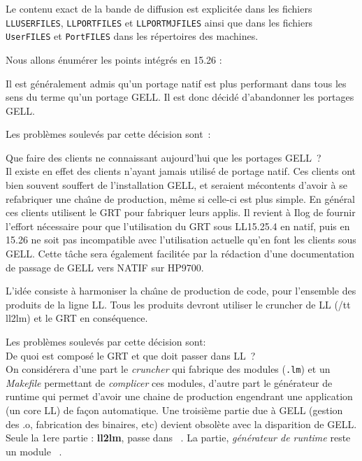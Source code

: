 Le contenu exact de la bande de diffusion est explicit\'{e}e dans les
fichiers {\tt LLUSERFILES}, {\tt LLPORTFILES} et {\tt LLPORTMJFILES}
ainsi que dans les fichiers {\tt UserFILES} et {\tt PortFILES} dans
les r\'{e}pertoires des machines.

Nous allons \'{e}num\'{e}rer les points int\'{e}gr\'{e}s en 15.26 :

Il est g\'{e}n\'{e}ralement admis qu'un portage natif est plus performant
dans tous les sens du terme qu'un portage GELL. Il est donc d\'{e}cid\'{e}
d'abandonner les portages GELL.

Les probl\`{e}mes soulev\'{e}s par cette d\'{e}cision sont\ : 

Que faire des clients ne connaissant aujourd'hui que les portages
GELL\ ? \\
Il existe en effet des clients n'ayant jamais utilis\'{e} de portage
natif. Ces clients ont bien souvent souffert de l'installation GELL,
et seraient m\'{e}contents d'avoir \`{a} se refabriquer une cha\^{\i}ne de
production, m\^{e}me si celle-ci est plus simple. En g\'{e}n\'{e}ral ces clients
utilisent le GRT pour fabriquer leurs applis. Il revient \`{a} Ilog de
fournir l'effort n\'{e}cessaire pour que l'utilisation du GRT sous
LL15.25.4 en natif, puis en 15.26 ne soit pas incompatible avec l'utilisation
actuelle qu'en font les clients sous GELL. Cette t\^{a}che sera
\'{e}galement facilit\'{e}e par la r\'{e}daction d'une documentation de passage
de GELL vers NATIF sur HP9700.

L'id\'{e}e consiste \`{a} harmoniser la cha\^{\i}ne de production de code, pour
l'ensemble des produits de la ligne LL. Tous les produits devront
utiliser le cruncher de LL ({/tt ll2lm}) et le GRT en cons\'{e}quence.

Les probl\`{e}mes soulev\'{e}s par cette d\'{e}cision sont: \\

De quoi est compos\'{e} le GRT et que doit passer dans LL\ ? \\
On consid\'{e}rera d'une part le {\it cruncher} qui fabrique des modules
({\tt .lm}) et un {\it Makefile} permettant de {\it complicer} ces
modules, d'autre part le g\'{e}n\'{e}rateur de runtime qui permet d'avoir
une chaine de production engendrant une application (un core LL) de
fa\c{c}on automatique. Une troisi\`{e}me partie due \`{a} GELL (gestion des .o,
fabrication des binaires, etc) devient obsol\`{e}te avec la disparition de
GELL. Seule la 1ere partie : {\bf ll2lm}, passe dans \LeLisp\ .
La partie, {\it g\'{e}n\'{e}rateur de runtime} reste un module \Aida\ .


